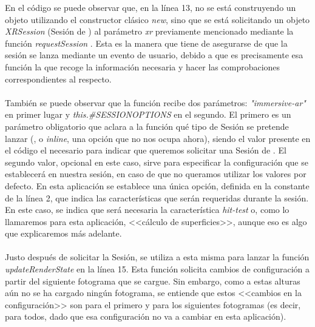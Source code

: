 \documentclass{subfiles}
\begin{document}
        En el código se puede observar que, en la línea 13, no se está construyendo un objeto utilizando el constructor clásico \textit{new}, sino que se está solicitando un objeto \textit{XRSession} (Sesión de \webxr) al parámetro \textit{xr} previamente mencionado mediante la función \textit{requestSession} \cite{web:requestsession}. Esta es la manera que tiene \webxr de asegurarse de que la sesión se lanza mediante un evento de usuario, debido a que es precisamente esa función la que recoge la información necesaria y hacer las comprobaciones correspondientes al respecto.

        \paragraph{}
        También se puede observar que la función recibe dos parámetros: \textit{"immersive-ar"} en primer lugar y \textit{this.\#SESSIONOPTIONS} en el segundo. El primero es un parámetro obligatorio que aclara a la función qué tipo de Sesión se pretende lanzar (\ra, \rv o \textit{inline}, una opción que no nos ocupa ahora), siendo el valor presente en el código el necesario para indicar que queremos solicitar una Sesión de \ra. El segundo valor, opcional en este caso, sirve para especificar la configuración que se establecerá en nuestra sesión, en caso de que no queramos utilizar los valores por defecto. En esta aplicación se establece una única opción, definida en la constante de la línea 2, que indica las características que serán requeridas durante la sesión. En este caso, se indica que será necesaria la característica \textit{hit-test} o, como lo llamaremos para esta aplicación, <<cálculo de superficies>>, aunque eso es algo que explicaremos más adelante.

        \paragraph{}
        Justo después de solicitar la Sesión, se utiliza a esta misma para lanzar la función \textit{updateRenderState} \cite{web:updaterenderstate} en la línea 15. Esta función solicita cambios de configuración a partir del siguiente fotograma que se cargue. Sin embargo, como a estas alturas aún no se ha cargado ningún fotograma, se entiende que estos <<cambios en la configuración>> son para el primero y para los siguientes fotogramas (es decir, para todos, dado que esa configuración no va a cambiar en esta aplicación).
\end{document}
